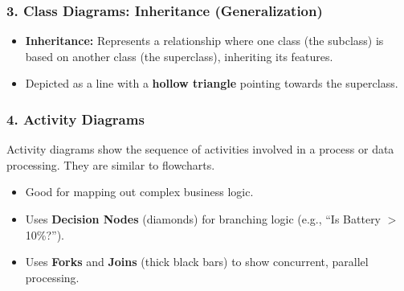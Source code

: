 \documentclass[xcolor=table]{beamer}
\begin{document}
\begin{frame}[fragile]
    \frametitle{3. Class Diagrams: Inheritance (Generalization)}
    \begin{itemize}
        \item \textbf{Inheritance:} Represents a relationship where one class (the subclass) is based on another class (the superclass), inheriting its features.
        \item Depicted as a line with a \textbf{hollow triangle} pointing towards the superclass.
    \end{itemize}
    
    \vspace{0.2cm}
    \begin{center}
        
    \end{center}
\end{frame}


\begin{frame}
    \frametitle{4. Activity Diagrams}
    Activity diagrams show the sequence of activities involved in a process or data processing. They are similar to flowcharts.
    
    
    
    \begin{itemize}
        \item Good for mapping out complex business logic.
        \item Uses \textbf{Decision Nodes} (diamonds) for branching logic (e.g., ``Is Battery $>$ 10\%?'').
        \item Uses \textbf{Forks} and \textbf{Joins} (thick black bars) to show concurrent, parallel processing.
    \end{itemize}
\end{frame}
\end{document}

